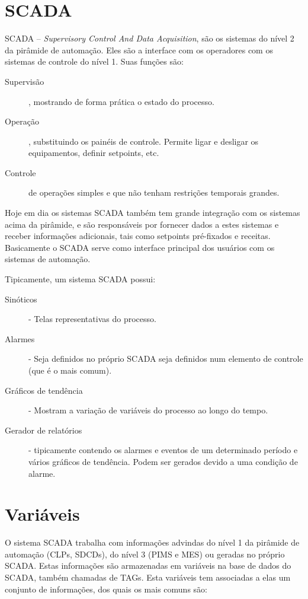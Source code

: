 \section{SCADA}

SCADA -- \emph{Supervisory Control And Data Acquisition}, são os sistemas do nível 2 da pirâmide de automação. Eles são a interface com os operadores com os sistemas de controle do nível 1. Suas funções são:

\begin{description}
\item[Supervisão], mostrando de forma prática o estado do processo.
\item[Operação], substituindo os painéis de controle. Permite ligar e desligar os equipamentos, definir setpoints, etc.
\item[Controle] de operações simples e que não tenham restrições temporais grandes.
\end{description}

Hoje em dia os sistemas SCADA também tem grande integração com os sistemas acima da pirâmide, e são responsáveis por fornecer dados a estes sistemas e receber informações adicionais, tais como setpoints pré-fixados e receitas. Basicamente o SCADA serve como interface principal dos usuários com os sistemas de automação.

Tipicamente, um sistema SCADA possui:
\begin{description}
	\item[Sinóticos] - Telas representativas do processo.
	\item[Alarmes] - Seja definidos no próprio SCADA seja definidos num elemento de controle (que é o mais comum).
	\item[Gráficos de tendência] - Mostram a variação de variáveis do processo ao longo do tempo.
	\item[Gerador de relatórios] - tipicamente contendo os alarmes e eventos de um determinado período e vários gráficos de tendência. Podem ser gerados devido a uma condição de alarme.
\end{description}

\section{Variáveis}
O sistema SCADA trabalha com informações advindas do nível 1 da pirâmide de automação (CLPs, SDCDs), do nível 3 (PIMS e MES) ou geradas no próprio SCADA. Estas informações são armazenadas em variáveis na base de dados do SCADA, também chamadas de TAGs. Esta variáveis tem associadas a elas um conjunto de informações, dos quais os mais comuns são:

